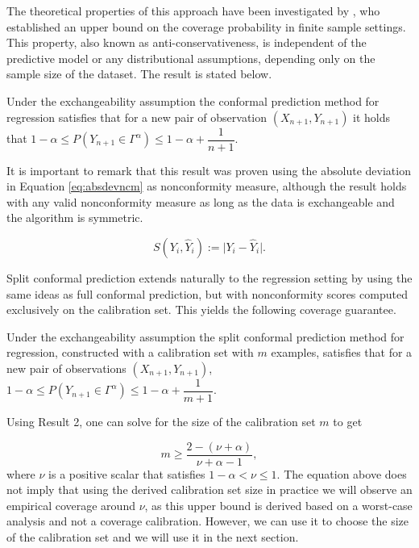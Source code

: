 The theoretical properties of this approach have been investigated by
\citet{lei2018}, who established an upper bound on the coverage probability in
finite sample settings. This property, also known as
anti-conservativeness, is independent of the predictive model or any
distributional assumptions, depending only on the sample size of the
dataset. The result is stated below.

\begin{result}
Under the exchangeability assumption the conformal prediction method for regression satisfies that for a new pair of observation $(X_{n+1},Y_{n+1})$ it holds that $1-\alpha \leq P(Y_{n+1}\in\Gamma^{\alpha})\leq 1-\alpha + \dfrac{1}{n+1}$.
\end{result}

It is important to remark that this result was proven using the absolute
deviation in Equation \eqref{eq:absdevncm} as nonconformity measure,
although the result holds with any valid nonconformity measure as long
as the data is exchangeable and the algorithm is symmetric.

\begin{equation}
S(Y_i,\hat{Y}_i) := \lvert Y_i - \hat{Y}_i \rvert.
\label{eq:absdevncm}
\end{equation}

Split conformal prediction extends naturally to the regression setting
by using the same ideas as full conformal prediction, but with
nonconformity scores computed exclusively on the calibration set. This
yields the following coverage guarantee.

\begin{result}
Under the exchangeability assumption the split conformal prediction method for regression, constructed with a calibration set with $m$ examples, satisfies that for a new pair of observations $(X_{n+1}, Y_{n+1})$, $1-\alpha \leq P(Y_{n+1}\in\Gamma^{\alpha})\leq 1- \alpha + \dfrac{1}{m+1}$.
\end{result}

Using Result 2, one can solve for the size of the calibration set
\(m\) to get

\begin{equation}
m\geq \dfrac{2-(\nu + \alpha)}{\nu + \alpha - 1},
\label{eq:scp-calsize}
\end{equation} where \(\nu\) is a positive scalar that satisfies
\(1-\alpha<\nu\leq1\). The equation above does not imply that using the
derived calibration set size in practice we will observe an empirical
coverage around \(\nu\), as this upper bound is derived based on a
worst-case analysis and not a coverage calibration. However, we can use
it to choose the size of the calibration set and we will use it in the
next section.

